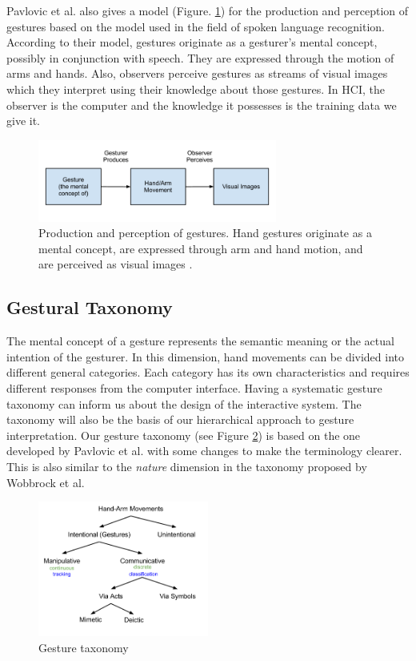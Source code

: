 Pavlovic et al. \cite{Pavlovic97} also gives a model (Figure. 
\ref{fig:gesture_production}) for the production and perception of gestures 
based on the model used in the field of spoken language recognition. According 
to their model, gestures originate as a gesturer's mental concept, possibly in 
conjunction with speech. They are expressed through the motion of arms and 
hands. Also, observers perceive gestures as streams of visual images which they
interpret using their knowledge about those gestures. In HCI, the 
observer is the computer and the knowledge it possesses is the training data we 
give it.

\begin{figure}[h]
  \centering
  \includegraphics[width=0.7\textwidth]{figures/gesture_production.png} 
  \caption{Production and perception of gestures. Hand gestures originate as a
  mental concept, are expressed through arm and hand motion, and are perceived
  as visual images \cite{Pavlovic97}.}
  \label{fig:gesture_production}
\end{figure}

\subsection{Gestural Taxonomy}\label{sec:taxonomy}
The mental concept of a gesture represents the semantic meaning or the
actual intention of the gesturer. In this dimension, hand movements can be
divided into different general categories. Each category has its own characteristics and requires different responses from the computer interface. Having a systematic gesture taxonomy can inform
us about the design of the interactive system. The taxonomy will also be the
basis of our hierarchical approach to gesture interpretation. Our gesture
taxonomy (see Figure \ref{fig:taxonomy}) is based on the one developed by Pavlovic et al.
\cite{Pavlovic97} with some changes to make the terminology clearer. This is
also similar to the \textit{nature} dimension in the taxonomy proposed by
Wobbrock et al. \cite{wobbrock09}

\begin{figure}[h]
  \centering
  \includegraphics[width=0.5\textwidth]{figures/taxonomy.png} 
  \caption{Gesture taxonomy}
  \label{fig:taxonomy}
\end{figure}


